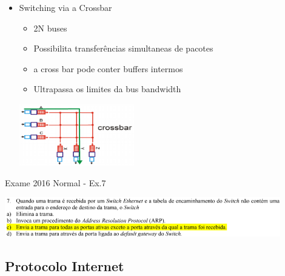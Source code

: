 \documentclass{article}
\begin{document}
\begin{itemize}
\begin{itemize}
\begin{itemize}
\begin{center}
            \end{center}
            \item Switching via a Crossbar
            \begin{itemize}
                \item 2N buses
                \item Possibilita transferências simultaneas de pacotes
                \item a cross bar pode conter buffers intermos
                \item Ultrapassa os limites da bus bandwidth
            \end{itemize}
            \begin{center}
                \includegraphics[width=5cm]{images/RCOM8.png}
            \end{center}
        \end{itemize}
        Exame 2016 Normal - Ex.7
        \begin{center}
            \includegraphics[width=12cm]{images/RCOM51.png}
        \end{center}
    \end{itemize}
\end{itemize}

\subsection{Protocolo Internet}
\end{document}
